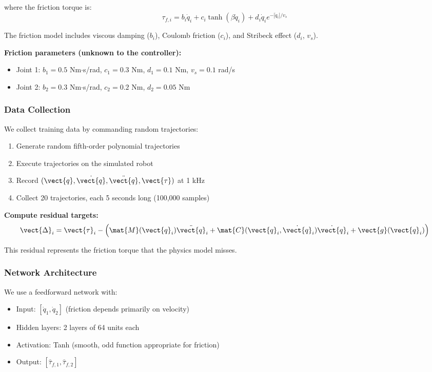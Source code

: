 where the friction torque is:
\begin{equation}
\tau_{f,i} = b_i \dot{q}_i + c_i \tanh(\beta \dot{q}_i) + d_i \dot{q}_i e^{-|\dot{q}_i|/v_s}
\end{equation}

The friction model includes viscous damping ($b_i$), Coulomb friction ($c_i$), and Stribeck effect ($d_i$, $v_s$).

\textbf{Friction parameters (unknown to the controller):}
\begin{itemize}
    \item Joint 1: $b_1 = 0.5$ Nm$\cdot$s/rad, $c_1 = 0.3$ Nm, $d_1 = 0.1$ Nm, $v_s = 0.1$ rad/s
    \item Joint 2: $b_2 = 0.3$ Nm$\cdot$s/rad, $c_2 = 0.2$ Nm, $d_2 = 0.05$ Nm
\end{itemize}

\subsubsection{Data Collection}

We collect training data by commanding random trajectories:
\begin{enumerate}
    \item Generate random fifth-order polynomial trajectories
    \item Execute trajectories on the simulated robot
    \item Record $(\vect{q}, \dot{\vect{q}}, \ddot{\vect{q}}, \vect{\tau})$ at 1 kHz
    \item Collect 20 trajectories, each 5 seconds long (100,000 samples)
\end{enumerate}

\textbf{Compute residual targets:}
\begin{equation}
\vect{\Delta}_i = \vect{\tau}_i - \left(\mat{M}(\vect{q}_i)\ddot{\vect{q}}_i + \mat{C}(\vect{q}_i, \dot{\vect{q}}_i)\dot{\vect{q}}_i + \vect{g}(\vect{q}_i)\right)
\end{equation}

This residual represents the friction torque that the physics model misses.

\subsubsection{Network Architecture}

We use a feedforward network with:
\begin{itemize}
    \item Input: $[\dot{q}_1, \dot{q}_2]$ (friction depends primarily on velocity)
    \item Hidden layers: 2 layers of 64 units each
    \item Activation: Tanh (smooth, odd function appropriate for friction)
    \item Output: $[\hat{\tau}_{f,1}, \hat{\tau}_{f,2}]$
\end{itemize}

